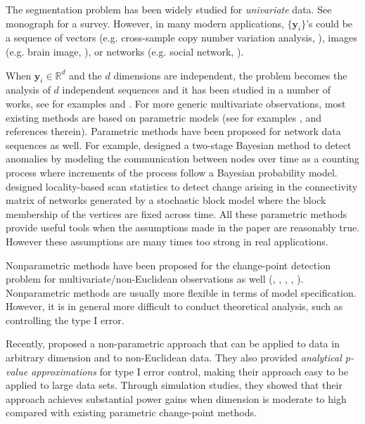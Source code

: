 \documentclass[arxiv, preprint]{imsart}
\numberwithin{equation}{section}
\theoremstyle{plain}
\begin{document}
The segmentation problem has been widely studied for \emph{univariate} data. See monograph \cite{carlstein1994change} for a survey.  However, in many modern applications, $\{\mathbf{y}_i\}$'s could be a sequence of vectors (e.g. cross-sample copy number variation analysis, \cite{zhang2010detecting}), images (e.g. brain image, \cite{park2015anomaly}), or networks (e.g. social network, \cite{Kossinets88}). 

When $\mathbf{y}_i \in \mathbb{R}^d$ and the $d$ dimensions are independent, the problem becomes the analysis of $d$ independent sequences and it has been studied in a number of works, see for examples \cite{zhang2010detecting} and \cite{xie2013sequential}. %
For more generic multivariate observations, most existing methods are based on parametric models (see for examples \cite{chen2011parametric}, \cite{csorgo1997limit} and references therein). %
Parametric methods have been proposed for network data sequences as well. For example, \cite{heard2010bayesian} designed a two-stage Bayesian method to detect anomalies by modeling the communication between nodes over time as a counting process where increments of the process follow a Bayesian probability model. \cite{wang2014locality} designed locality-based scan statistics to detect change arising in the connectivity matrix of networks generated by a stochastic block model where the block membership of the vertices are fixed across time. All these parametric methods provide useful tools when the assumptions made in the paper are reasonably true. However these assumptions are many times too strong in real applications. 

Nonparametric methods have been proposed for the change-point detection problem for multivariate/non-Euclidean observations as well (\cite{jirak2015uniform}, \cite{matteson2014nonparametric}, \cite{lung2011homogeneity}, \cite{cule2010maximum}, \cite{desobry2005online}). Nonparametric methods are usually more flexible in terms of model specification. However, it is in general more difficult to conduct theoretical analysis, such as controlling the type I error. 
 
Recently, \cite{chen2015graph} proposed a non-parametric approach that can be applied to data in arbitrary dimension and to non-Euclidean data. They also provided \emph{analytical p-value approximations} for type I error control, making their approach easy to be applied to large data sets.  Through simulation studies, they showed that their approach achieves substantial power gains when dimension is moderate to high compared with existing parametric change-point methods.  
\end{document}
